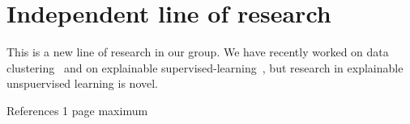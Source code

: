 \documentclass[a4paper,11pt]{article}
\begin{document}
\section{Independent line of research}


This is a new line of research in our group. 
We have recently worked on data clustering~\cite{spoerhase2023constant,thejaswi2021diversity}
and on explainable supervised-learning~\cite{ciaperoni2023concise,zhang2020diverse,zhang2023regularized}, 
but research in explainable unspuervised learning is novel.


{\small
\setlength{\bibsep}{0pt}


}

{\color{orange}References 1 page maximum} 

% 
\end{document}
